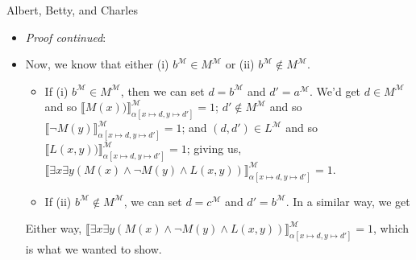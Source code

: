 \begin{frame}{Albert, Betty, and Charles}

	\begin{itemize}%
	\itemsep=16pt
		\item \emph{Proof continued}: 	
				
		\item[] Now, we know that either (i) $b^\mathcal{M}\in M^\mathcal{M}$ or (ii) $b^\mathcal{M}\notin M^\mathcal{M}$. 	
 \begin{itemize}
			
			\item If (i) $b^\mathcal{M}\in M^\mathcal{M}$, then we can set $d=b^\mathcal{M}$ and $d'=a^\mathcal{M}$. We'd get $d\in M^\mathcal{M}$ and so $\llbracket M(x))\rrbracket_{\alpha[x\mapsto d, y\mapsto d']}^\mathcal{M}=1$; $d'\notin M^\mathcal{M}$ and so $\llbracket\neg M(y)\rrbracket_{\alpha[x\mapsto d, y\mapsto d']}^\mathcal{M}=1$; and $( d,d')\in L^\mathcal{M}$ and so $\llbracket L(x,y))\rrbracket_{\alpha[x\mapsto d, y\mapsto d']}^\mathcal{M}=1$; giving us, $\llbracket \exists x\exists y(M(x)\land \neg M(y)\land L(x,y))\rrbracket_{\alpha[x\mapsto d, y\mapsto d']}^\mathcal{M}=1$. 
			
		\item If (ii) $b^\mathcal{M}\notin M^\mathcal{M}$, we can set $d=c^\mathcal{M}$ and $d'=b^\mathcal{M}$. In a similar way, we get 
				
		\end{itemize}

Either way, $\llbracket \exists x\exists y(M(x)\land \neg M(y)\land L(x,y))\rrbracket_{\alpha[x\mapsto d, y\mapsto d']}^\mathcal{M}=1$, which is what we wanted to show.

	\end{itemize}

\end{frame}

\begin{frame}
\begin{center}
\huge \smiley
\end{center}

\end{frame}

